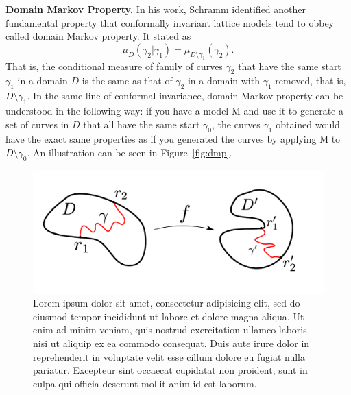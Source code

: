 \textbf{Domain Markov Property.}
In his work, Schramm identified another fundamental property that conformally
invariant lattice models tend to obbey called domain Markov property. It
stated as
\begin{equation}
    \newcommand{\pp}[1]{\left(#1\right)}
    \mu_D\pp{\gamma_2|\gamma_1} = \mu_{D\setminus\gamma_1}\pp{\gamma_2}.
\end{equation}
That is, the conditional measure of family of curves $\gamma_2$ that have the
same start $\gamma_1$ in a domain $D$ is the same as that of $\gamma_2$ in
a domain with $\gamma_1$ removed, that is, $D\setminus\gamma_1$.
In the same line of conformal invariance, domain Markov property can be
understood in the following way: if you have a model M and use it to generate a
set of curves in $D$ that all have the same start $\gamma_0$, the curves
$\gamma_1$ obtained would have the exact same properties as if you generated
the curves by applying M to $D\setminus\gamma_0$. An illustration can be
seen in Figure~\ref{fig:dmp}.

\begin{figure}
\begin{center}
    \includegraphics[scale=0.8]{chapters/ch4-sle/figs/confinv}
\end{center}
\caption{Lorem ipsum dolor sit amet, consectetur adipisicing elit, sed do
    eiusmod tempor incididunt ut labore et dolore magna aliqua. Ut enim ad
    minim veniam, quis nostrud exercitation ullamco laboris nisi ut aliquip ex
    ea commodo consequat. Duis aute irure dolor in reprehenderit in voluptate
    velit esse cillum dolore eu fugiat nulla pariatur. Excepteur sint occaecat
    cupidatat non proident, sunt in culpa qui officia deserunt mollit anim id
    est laborum.}
\label{fig:confinv}
\end{figure}


